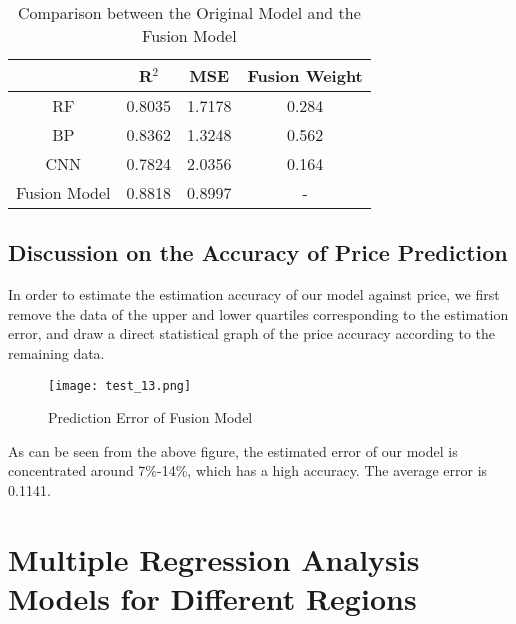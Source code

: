 \begin{table}[htbp]
    \begin{center}
    \caption{Comparison between the Original Model and the Fusion Model}
    \resizebox{\textwidth}{!} %
    {\begin{tabular}{c c c c}
    \toprule[2pt]
    \multicolumn{1}{m{4cm}}{\centering \textbf{}} %
    &\multicolumn{1}{m{4cm}}{\centering \textbf{R$^2$}}
    &\multicolumn{1}{m{4cm}}{\centering \textbf{MSE}}
    &\multicolumn{1}{m{4cm}}{\centering \textbf{Fusion Weight}}\\
    \midrule
    RF           & 0.8035 & 1.7178 & 0.284 \\
    BP           & 0.8362 & 1.3248 & 0.562 \\
    CNN          & 0.7824 & 2.0356 & 0.164 \\
    Fusion Model & 0.8818 & 0.8997 &   -   \\
    \bottomrule[2pt]
    \end{tabular}}
    \end{center}
\end{table}
\vspace{-0.5cm}
\subsection{Discussion on the Accuracy of Price Prediction}
In order to estimate the estimation accuracy of our model against price, we first remove the data of the upper and lower quartiles corresponding to the estimation error, and draw a direct statistical graph of the price accuracy according to the remaining data.

\begin{figure}[H]  %
    \centering  %
    \texttt{[image: test\_13.png]} %
    \caption{Prediction Error of Fusion Model} %
    \vspace{-0.5cm}
\end{figure}

As can be seen from the above figure, the estimated error of our model is concentrated around 7\%-14\%, which has a high accuracy. The average error is 0.1141.


\section{Multiple Regression Analysis Models for Different Regions}
